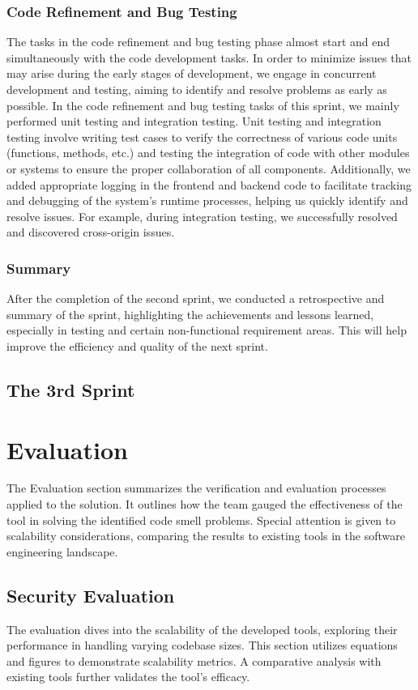 \documentclass[journal]{IEEEtran}
\begin{document}
\subsubsection{Code Refinement and Bug Testing}
The tasks in the code refinement and bug testing phase almost start and end simultaneously with the code development tasks. In order to minimize issues that may arise during the early stages of development, we engage in concurrent development and testing, aiming to identify and resolve problems as early as possible. In the code refinement and bug testing tasks of this sprint, we mainly performed unit testing and integration testing. Unit testing and integration testing involve writing test cases to verify the correctness of various code units (functions, methods, etc.) and testing the integration of code with other modules or systems to ensure the proper collaboration of all components. Additionally, we added appropriate logging in the frontend and backend code to facilitate tracking and debugging of the system's runtime processes, helping us quickly identify and resolve issues. For example, during integration testing, we successfully resolved and discovered cross-origin issues.

\subsubsection{Summary}
After the completion of the second sprint, we conducted a retrospective and summary of the sprint, highlighting the achievements and lessons learned, especially in testing and certain non-functional requirement areas. This will help improve the efficiency and quality of the next sprint.

\subsection{The 3rd Sprint}


\section{Evaluation}
\noindent The Evaluation section summarizes the verification and evaluation processes applied to the solution. It outlines how the team gauged the effectiveness of the tool in solving the identified code smell problems. Special attention is given to scalability considerations, comparing the results to existing tools in the software engineering landscape.

\subsection{Security Evaluation}
The evaluation dives into the scalability of the developed tools, exploring their performance in handling varying codebase sizes. This section utilizes equations and figures to demonstrate scalability metrics. A comparative analysis with existing tools further validates the tool's efficacy.
\end{document}
